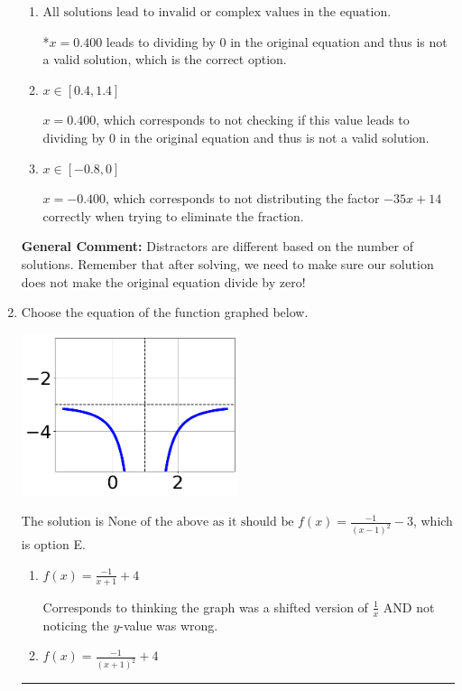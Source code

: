 \documentclass{extbook}[14pt]
\newcommand{\litem}[1]{\item #1

\rule{\textwidth}{0.4pt}}
\begin{document}
\begin{enumerate}
{\begin{enumerate}[label=\Alph*.]
$x = -0.400 \text{ and } x = 0.400$, which corresponds to getting the correct solution and believing there should be a second solution to the equation.
\item \( \text{All solutions lead to invalid or complex values in the equation.} \)

*$x = 0.400$ leads to dividing by 0 in the original equation and thus is not a valid solution, which is the correct option.
\item \( x \in [0.4,1.4] \)

$x = 0.400$, which corresponds to not checking if this value leads to dividing by 0 in the original equation and thus is not a valid solution.
\item \( x \in [-0.8,0] \)

$x = -0.400$, which corresponds to not distributing the factor $-35x + 14$ correctly when trying to eliminate the fraction.
\end{enumerate}

\textbf{General Comment:} Distractors are different based on the number of solutions. Remember that after solving, we need to make sure our solution does not make the original equation divide by zero!
}
\litem{
Choose the equation of the function graphed below.

\begin{center}
    \includegraphics[width=0.5\textwidth]{../Figures/rationalGraphToEquationCopyC.png}
\end{center}


The solution is \( \text{None of the above as it should be } f(x) = \frac{-1}{(x - 1)^2} - 3 \), which is option E.\begin{enumerate}[label=\Alph*.]
\item \( f(x) = \frac{-1}{x + 1} + 4 \)

Corresponds to thinking the graph was a shifted version of $\frac{1}{x}$ AND not noticing the $y$-value was wrong.
\item \( f(x) = \frac{-1}{(x + 1)^2} + 4 \)


\end{enumerate}}
\end{enumerate}
\end{document}
